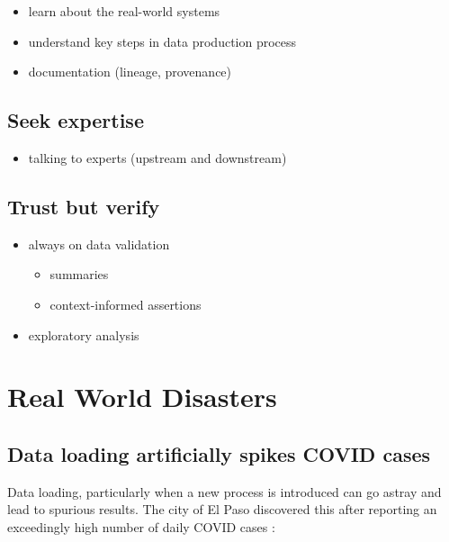 \documentclass[
]{krantz}
\providecommand{\tightlist}{%
  \setlength{\itemsep}{0pt}\setlength{\parskip}{0pt}}
\begin{document}
\begin{itemize}
\tightlist
\item
  learn about the real-world systems
\item
  understand key steps in data production process
\item
  documentation (lineage, provenance)
\end{itemize}

\hypertarget{seek-expertise}{%
\subsection{Seek expertise}\label{seek-expertise}}

\begin{itemize}
\tightlist
\item
  talking to experts (upstream and downstream)
\end{itemize}

\hypertarget{trust-but-verify}{%
\subsection{Trust but verify}\label{trust-but-verify}}

\begin{itemize}
\tightlist
\item
  always on data validation

  \begin{itemize}
  \tightlist
  \item
    summaries
  \item
    context-informed assertions
  \end{itemize}
\item
  exploratory analysis
\end{itemize}

\hypertarget{real-world-disasters}{%
\section{Real World Disasters}\label{real-world-disasters}}

\hypertarget{data-loading-artificially-spikes-covid-cases}{%
\subsection{Data loading artificially spikes COVID cases}\label{data-loading-artificially-spikes-covid-cases}}

Data loading, particularly when a new process is introduced can go astray and lead to spurious results.
The city of El Paso discovered this after reporting an exceedingly high number of daily COVID cases \citep{borunda_2020}:
\end{document}

